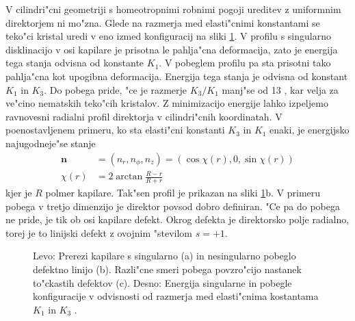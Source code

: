 \documentclass[12pt,twoside,openright,final]{report}
\renewcommand{\vec}{\mathbf}
\begin{document}
V cilindri"cni geometriji s homeotropnimi robnimi pogoji ureditev z uniformnim direktorjem ni mo"zna. 
Glede na razmerja med elasti"cnimi konstantami se teko"ci kristal uredi v eno izmed konfiguracij na sliki \ref{fig:director-profiles}. 
V profilu s singularno disklinacijo v osi kapilare je prisotna le pahlja"cna deformacija, zato je energija tega stanja odvisna od konstante $K_1$. 
V pobeglem profilu pa sta prisotni tako pahlja"cna kot upogibna deformacija.
Energija tega stanja je odvisna od konstant $K_1$ in $K_3$. 
Do pobega pride, "ce je razmerje $K_3/K_1$ manj"se od 13 \cite{kleman}, kar velja za ve"cino nematskih teko"cih kristalov. 
Z minimizacijo energije lahko izpeljemo ravnovesni radialni profil direktorja v cilindri"cnih koordinatah. 
V poenostavljenem primeru, ko sta elasti"cni konstanti $K_3$ in $K_1$ enaki, je energijsko najugodneje"se stanje 
\begin{align}
 \vec n &= (n_r, n_\phi, n_z) = (\cos \chi(r), 0, \sin \chi(r)) \\
 \chi(r) &= 2 \arctan \frac{R-r}{R+r}
\end{align}
kjer je $R$ polmer kapilare. 
Tak"sen profil je prikazan na sliki \ref{fig:director-profiles}b. 
V primeru pobega v tretjo dimenzijo je direktor povsod dobro definiran. 
"Ce pa do pobega ne pride, je tik ob osi kapilare defekt. Okrog defekta je direktorsko polje radialno, torej je to linijski defekt z ovojnim "stevilom $s=+1$. 

\begin{figure}[!htbp]
\centering
{}
\caption{Levo: Prerezi kapilare s singularno (a) in nesingularno pobeglo defektno linijo (b). 
Razli"cne smeri pobega povzro"cijo nastanek to"ckastih defektov (c). Desno: Energija singularne in pobegle konfiguracije v odvisnosti od razmerja med elasti"cnima kostantama $K_1$ in $K_3$ \cite{kleman}. }
 \label{fig:director-profiles}
\end{figure}
\end{document}

